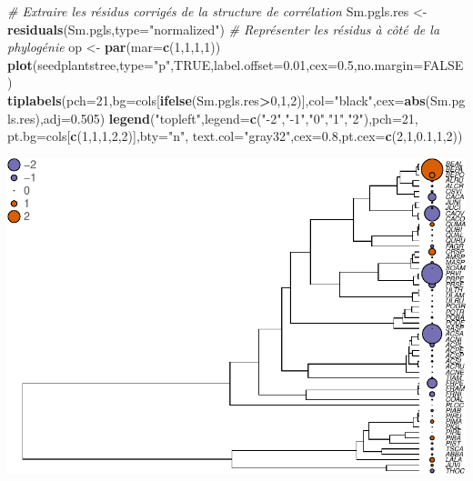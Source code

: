 \documentclass[
]{book}
\newenvironment{Shaded}{\begin{snugshade}}{\end{snugshade}}
\newcommand{\AttributeTok}[1]{\textcolor[rgb]{0.13,0.29,0.53}{#1}}
\newcommand{\CommentTok}[1]{\textcolor[rgb]{0.56,0.35,0.01}{\textit{#1}}}
\newcommand{\ConstantTok}[1]{\textcolor[rgb]{0.56,0.35,0.01}{#1}}
\newcommand{\DecValTok}[1]{\textcolor[rgb]{0.00,0.00,0.81}{#1}}
\newcommand{\FloatTok}[1]{\textcolor[rgb]{0.00,0.00,0.81}{#1}}
\newcommand{\FunctionTok}[1]{\textcolor[rgb]{0.13,0.29,0.53}{\textbf{#1}}}
\newcommand{\NormalTok}[1]{#1}
\newcommand{\OtherTok}[1]{\textcolor[rgb]{0.56,0.35,0.01}{#1}}
\newcommand{\SpecialCharTok}[1]{\textcolor[rgb]{0.81,0.36,0.00}{\textbf{#1}}}
\newcommand{\StringTok}[1]{\textcolor[rgb]{0.31,0.60,0.02}{#1}}
\begin{document}
\begin{Shaded}
\begin{Highlighting}[]
\CommentTok{\# Extraire les résidus corrigés de la structure de corrélation}
\NormalTok{Sm.pgls.res }\OtherTok{\textless{}{-}} \FunctionTok{residuals}\NormalTok{(Sm.pgls,}\AttributeTok{type=}\StringTok{"normalized"}\NormalTok{)}
\CommentTok{\# Représenter les résidus à côté de la phylogénie}
\NormalTok{op }\OtherTok{\textless{}{-}} \FunctionTok{par}\NormalTok{(}\AttributeTok{mar=}\FunctionTok{c}\NormalTok{(}\DecValTok{1}\NormalTok{,}\DecValTok{1}\NormalTok{,}\DecValTok{1}\NormalTok{,}\DecValTok{1}\NormalTok{))}
\FunctionTok{plot}\NormalTok{(seedplantstree,}\AttributeTok{type=}\StringTok{"p"}\NormalTok{,}\ConstantTok{TRUE}\NormalTok{,}\AttributeTok{label.offset=}\FloatTok{0.01}\NormalTok{,}\AttributeTok{cex=}\FloatTok{0.5}\NormalTok{,}\AttributeTok{no.margin=}\ConstantTok{FALSE}\NormalTok{)}
\FunctionTok{tiplabels}\NormalTok{(}\AttributeTok{pch=}\DecValTok{21}\NormalTok{,}\AttributeTok{bg=}\NormalTok{cols[}\FunctionTok{ifelse}\NormalTok{(Sm.pgls.res}\SpecialCharTok{\textgreater{}}\DecValTok{0}\NormalTok{,}\DecValTok{1}\NormalTok{,}\DecValTok{2}\NormalTok{)],}\AttributeTok{col=}\StringTok{"black"}\NormalTok{,}\AttributeTok{cex=}\FunctionTok{abs}\NormalTok{(Sm.pgls.res),}\AttributeTok{adj=}\FloatTok{0.505}\NormalTok{)}
\FunctionTok{legend}\NormalTok{(}\StringTok{"topleft"}\NormalTok{,}\AttributeTok{legend=}\FunctionTok{c}\NormalTok{(}\StringTok{"{-}2"}\NormalTok{,}\StringTok{"{-}1"}\NormalTok{,}\StringTok{"0"}\NormalTok{,}\StringTok{"1"}\NormalTok{,}\StringTok{"2"}\NormalTok{),}\AttributeTok{pch=}\DecValTok{21}\NormalTok{,}
       \AttributeTok{pt.bg=}\NormalTok{cols[}\FunctionTok{c}\NormalTok{(}\DecValTok{1}\NormalTok{,}\DecValTok{1}\NormalTok{,}\DecValTok{1}\NormalTok{,}\DecValTok{2}\NormalTok{,}\DecValTok{2}\NormalTok{)],}\AttributeTok{bty=}\StringTok{"n"}\NormalTok{,}
       \AttributeTok{text.col=}\StringTok{"gray32"}\NormalTok{,}\AttributeTok{cex=}\FloatTok{0.8}\NormalTok{,}\AttributeTok{pt.cex=}\FunctionTok{c}\NormalTok{(}\DecValTok{2}\NormalTok{,}\DecValTok{1}\NormalTok{,}\FloatTok{0.1}\NormalTok{,}\DecValTok{1}\NormalTok{,}\DecValTok{2}\NormalTok{))}
\end{Highlighting}
\end{Shaded}

\includegraphics{pcm-workshop_files/figure-latex/Challenge 3 - solution-1.pdf}
\end{document}
